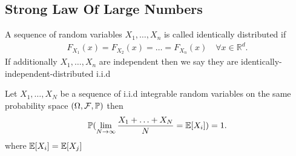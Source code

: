 \subsection{Strong Law Of Large Numbers}
\begin{definition}
 A sequence of random variables $X_{1},\ldots ,X_n$  is called identically distributed if 
 \begin{align*}
   F_{X_{1}}(x)= F_{X_{2}}(x) = \ldots  = F_{X_n}(x) \quad \forall x \in  \mathbb{R}^{d}  
 .\end{align*}
 If additionally $X_{1},\ldots ,X_n$ are independent then we say they are identically-independent-distributed i.i.d
\end{definition}
\begin{theorem}
 Let $X_{1},\ldots ,X_N$  be a sequence of i.i.d integrable random variables on the same probability
 space $(\Omega ,\mathcal{F},\P)$ then 
 \begin{align*}
   \P(\lim_{N \to  \infty} \frac{X_1 + \ldots  + X_N}{N} = \E[X_i]) = 1
 .\end{align*}
 where $\E[X_i] = \E[X_j]$ 
\end{theorem}
